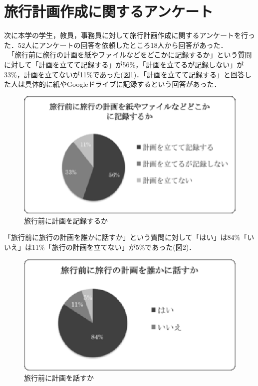 \documentclass{funthesis}
\begin{document}
\section{旅行計画作成に関するアンケート}
次に本学の学生，教員，事務員に対して旅行計画作成に関するアンケートを行った．52人にアンケートの回答を依頼したところ18人から回答があった．\\
　「旅行前に旅行の計画を紙やファイルなどをどこかに記録するか」という質問に対して「計画を立てて記録する」が56\%，「計画を立てるが記録しない」が33\%，計画を立てないが11\%であった(図1)．「計画を立てて記録する」と回答した人は具体的に紙やGoogleドライブに記録するという回答があった．
\begin{figure}[htpb]
\begin{center}
\includegraphics[scale=1.0]{filerecord.eps}
\caption{旅行前に計画を記録するか}
\end{center}
\end{figure}

「旅行前に旅行の計画を誰かに話すか」という質問に対して「はい」は84\%「いいえ」は11\%「旅行の計画を立てない」が5\%であった(図2)．\\
\begin{figure}[htpb]
\begin{center}
\includegraphics[scale=1.0]{beforetalktrip.eps}
\caption{旅行前に計画を話すか}
\end{center}
\end{figure}
\end{document}
